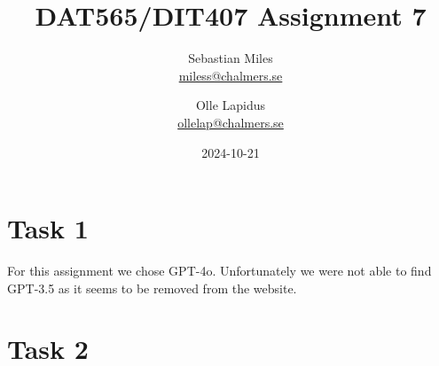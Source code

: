 \documentclass[a4paper]{article}
\begin{document}
\author{
  Sebastian Miles \\
  \href{mailto:miless@chalmers.se}{miless@chalmers.se}
  \and
  Olle Lapidus \\
  \href{mailto:ollelap@chalmers.se}{ollelap@chalmers.se}
}
\title{DAT565/DIT407 Assignment 7}
\date{2024-10-21}

\maketitle
\section*{Task 1}
For this assignment we chose GPT-4o. Unfortunately we were not able to find GPT-3.5 as it seems to be removed from the website.

\section*{Task 2}
\end{document}
